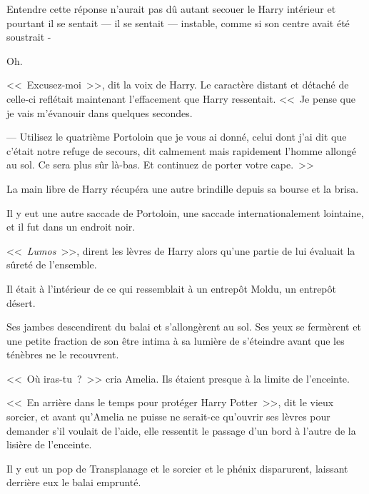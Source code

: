 Entendre cette réponse n'aurait pas dû autant secouer le Harry intérieur et pourtant il se sentait — il se sentait — instable, comme si son centre avait été soustrait -

Oh.

<<~Excusez-moi~>>, dit la voix de Harry. Le caractère distant et détaché de celle-ci reflétait maintenant l'effacement que Harry ressentait. <<~Je pense que je vais m'évanouir dans quelques secondes.

--- Utilisez le quatrième Portoloin que je vous ai donné, celui dont j'ai dit que c'était notre refuge de secours, dit calmement mais rapidement l'homme allongé au sol. Ce sera plus sûr là-bas. Et continuez de porter votre cape.~>>

La main libre de Harry récupéra une autre brindille depuis sa bourse et la brisa.

Il y eut une autre saccade de Portoloin, une saccade internationalement lointaine, et il fut dans un endroit noir.

<<~\emph{Lumos}~>>, dirent les lèvres de Harry alors qu'une partie de lui évaluait la sûreté de l'ensemble.

Il était à l'intérieur de ce qui ressemblait à un entrepôt Moldu, un entrepôt désert.

Ses jambes descendirent du balai et s'allongèrent au sol. Ses yeux se fermèrent et une petite fraction de son être intima à sa lumière de s'éteindre avant que les ténèbres ne le recouvrent.

\later

<<~Où iras-tu~?~>> cria Amelia. Ils étaient presque à la limite de l'enceinte.

<<~En arrière dans le temps pour protéger Harry Potter~>>, dit le vieux sorcier, et avant qu'Amelia ne puisse ne serait-ce qu'ouvrir ses lèvres pour demander s'il voulait de l'aide, elle ressentit le passage d'un bord à l'autre de la lisière de l'enceinte.

Il y eut un pop de Transplanage et le sorcier et le phénix disparurent, laissant derrière eux le balai emprunté.
